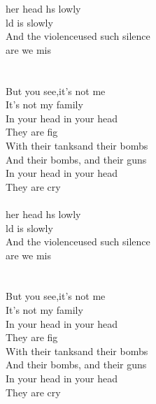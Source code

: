 \begin{cancion}%
	her head hs lowly\\
	ld is slowly   \\
	And the violenceused such silence\\
	 are we mis\\
	\jump\\
\jump\\
	But you see,it's not me\\
	It's not my  family\\
	In your head  in your head\\
	They are fig\\
	With their tanksand their bombs\\
	And their bombs,  and their guns\\
	In your head   in your head \\
	They are cry\\
\jump\\
	her head hs lowly\\
	ld is slowly   \\
	And the violenceused such silence\\
	 are we mis\\
	\jump\\
\jump\\
	But you see,it's not me\\
	It's not my  family\\
	In your head  in your head\\
	They are fig\\
	With their tanksand their bombs\\
	And their bombs,  and their guns\\
	In your head   in your head \\
	They are cry\\
\end{cancion}%
